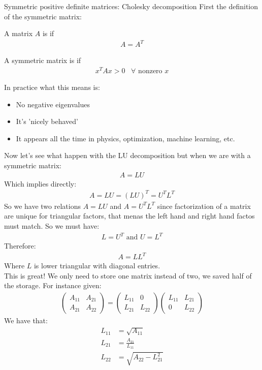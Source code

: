 \begin{parag}{Symmetric positive definite matrices: Cholesky decomposition}
    First the definition of the symmetric matrix:
	\begin{definition}
	A matrix $A$ is  if 
	\begin{align*} A = A^{T} \end{align*}
	\end{definition}
	\begin{definition}
	A symmetric matrix is  if 
	\begin{align*} x^{T}Ax > 0 \;\;\; \forall \text{ nonzero }x \end{align*}
	\end{definition}
	In practice what this means is:
	\begin{itemize}
		\item No negative eigenvalues
		\item It's 'nicely behaved'
		\item It appears all the time in physics, optimization, machine learning, etc.
	\end{itemize}
	Now let's see what happen with the LU decomposition but when we are with a symmetric matrix:
	\begin{align*} A = LU \end{align*}
	Which implies directly:
	\begin{align*} A = LU = \left(LU\right)^{T} = U^{T}L^{T} \end{align*}
	So we have two relations $A =  LU$ and $A = U^TL^T$ since factorization of a matrix are unique for triangular factors, that menas the left hand and right hand factos must match. So we must have:
	\begin{align*} L = U^T  \text{ and } U =  L^T\end{align*}
	Therefore:
	\begin{align*} A = LL^T \end{align*}
	Where $L$ is lower triangular with  diagonal entries.\\
	This is great! We only need to store one matrix instead of two, we saved half of the storage.
	For instance given:
	\begin{align*} \begin{pmatrix} A_{11} & A_{21} \\ A_{21} & A_{22} \end{pmatrix} = \begin{pmatrix} L_{11} & 0 \\ L_{21} & L_{22} \end{pmatrix} \begin{pmatrix} L_{11} & L_{21} \\ 0 &  L_{22}\end{pmatrix} \end{align*}
	We have that:
	\begin{align*} 
		L_{11} &= \sqrt{A_{11}}\\
		L_{21} &= \frac{A_{21}}{L_{11}}\\
		L_{22} &= \sqrt{A_{22} - L_{21}^2}
	\end{align*}
	
\end{parag}








